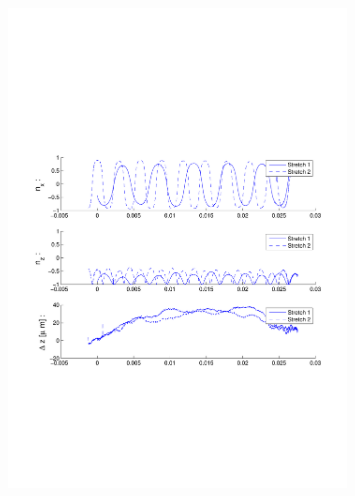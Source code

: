 \begin{figure}[H]
\centering
\includegraphics[width=0.8\textwidth]{Images/Particle 13/Stretch1.pdf}
\end{figure}


